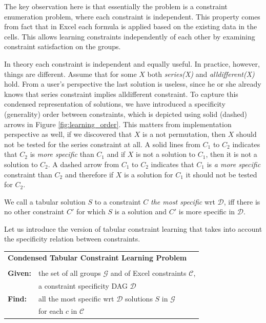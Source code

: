 \documentclass{ecai}
\newcommand{\constraints}{\ensuremath{\mathcal{C}}\xspace}
\newcommand{\dependencies}{\ensuremath{\mathcal{D}}\xspace}
\newcommand{\groups}{\ensuremath{\mathcal{G}}\xspace}
\begin{document}
  The key observation here is that essentially the problem is a constraint enumeration problem, where each constraint is independent. This property comes from fact that in Excel each formula is applied based on the existing data in the cells. This allows learning constraints independently of each other by examining constraint satisfaction on the groups.


  In theory each constraint is independent and equally useful. In practice, however, things are different. Assume that for some $X$ both \textit{series(X)} and \textit{alldifferent(X)} hold. From a user's perspective the last solution is useless, since he or she already knows that series constraint implies alldifferent constraint. To capture this condensed representation \cite{condensed} of solutions, we have introduced a specificity (generality) order between constraints, which is depicted using solid (dashed) arrows in Figure \ref{fig:learning_order}. This matters from implementation perspective as well, if we discovered that $X$ is a not permutation, then $X$ should not be tested for the series constraint at all. A solid lines from $C_1$ to $C_2$ indicates that $C_2$ is \textit{more specific} than $C_1$ and if $X$ is not a solution to $C_1$, then it is not a solution to $C_2$. A dashed arrow from $C_1$ to $C_2$ indicates that $C_1$ is \textit{a more specific} constraint than $C_2$ and therefore if $X$ is a solution for $C_1$ it should not be tested for $C_2$.

We call a tabular solution $S$ to a constraint $C$ \textit{the most specific} wrt \dependencies, iff there is no other constraint $C'$ for which $S$ is a solution and $C'$ is more specific in \dependencies.


Let us introduce the version of tabular constraint learning that takes into account the specificity relation between constraints.

\begin{minipage}[c]{14em}
  \vspace{5pt}
  \begin{tabular}{ll}
    \multicolumn{2}{l}{{\textbf{Condensed Tabular Constraint Learning Problem}}}\\
    \vspace{-4pt}
    &\\
    \textbf{Given:}& the set of all groups $\groups$ and of Excel constraints $\constraints$,\\ 
    & a constraint specificity DAG \dependencies \\
    \textbf{Find:}& all the most specific wrt \dependencies solutions $S$ in \groups\\ 
    & for each $c$ in \constraints \\
  \end{tabular}
  \vspace{6pt}
\end{minipage}
\end{document}
